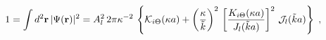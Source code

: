 \begin{equation}
1
 = 
\int d^{2} {\bf  r} \, 
| 
\Psi
({\bf r})|^2  
 =
A_{l}^{2} \, 
2\pi
 \kappa^{-2} \, 
\left\{
{\mathcal K}_{i \Theta} (\kappa a) + 
\left( \frac{\kappa }{\tilde{k} } \right)^{2}
\,
\left[
\frac{
K_{i \Theta}  (\kappa a)  }{
J_{l}  ( \tilde{k} a ) }
 \right]^{2}
\,
{\mathcal J_{l}}( \tilde{k} a )  
\right\}
\; ,
\label{eq:normaliz_2D_ISP_circular_well_reg}
\end{equation}

